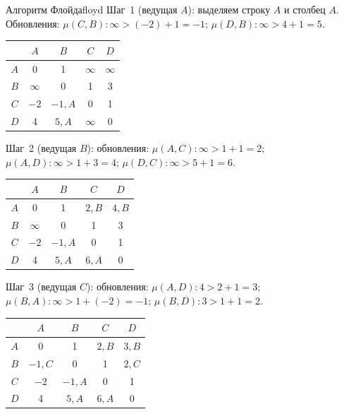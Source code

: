 \begin{algo}{Алгоритм Флойда}{floyd}
Шаг~1 (ведущая $A$): выделяем строку $A$ и столбец $A$. Обновления: $\mu(C,B)\colon \infty > (-2) + 1 = -1$; $\mu(D,B)\colon \infty > 4 + 1 = 5$.
\begin{center}
\begin{tabular}{c|cccc}
     & $A$      & $B$      & $C$      & $D$      \\
\hline
$A$  & 0        & 1        & $\infty$ & $\infty$ \\
$B$  & $\infty$ & 0        & 1        & 3        \\
$C$  & $-2$     & $-1, A$  & 0        & 1        \\
$D$  & 4        & $5, A$   & $\infty$ & 0        \\
\end{tabular}
\end{center}

Шаг~2 (ведущая $B$): обновления: $\mu(A,C)\colon \infty > 1 + 1 = 2$; $\mu(A,D)\colon \infty > 1 + 3 = 4$; $\mu(D,C)\colon \infty > 5 + 1 = 6$.
\begin{center}
\begin{tabular}{c|cccc}
     & $A$      & $B$      & $C$      & $D$      \\
\hline
$A$  & 0        & 1        & $2, B$   & $4, B$   \\
$B$  & $\infty$ & 0        & 1        & 3        \\
$C$  & $-2$     & $-1, A$  & 0        & 1        \\
$D$  & 4        & $5, A$   & $6, A$   & 0        \\
\end{tabular}
\end{center}

Шаг~3 (ведущая $C$): обновления: $\mu(A,D)\colon 4 > 2 + 1 = 3$; $\mu(B,A)\colon \infty > 1 + (-2) = -1$; $\mu(B,D)\colon 3 > 1 + 1 = 2$.
\begin{center}
\begin{tabular}{c|cccc}
     & $A$      & $B$      & $C$      & $D$      \\
\hline
$A$  & 0        & 1        & $2, B$   & $3, B$   \\
$B$  & $-1, C$  & 0        & 1        & $2, C$   \\
$C$  & $-2$     & $-1, A$  & 0        & 1        \\
$D$  & 4        & $5, A$   & $6, A$   & 0        \\
\end{tabular}
\end{center}


\end{algo}
